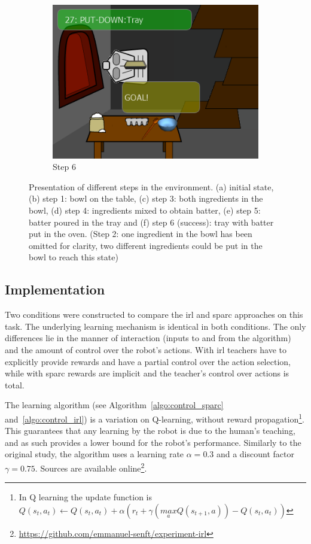 \begin{figure}[ht]
\begin{subfigure}[b]{0.325\textwidth}
		\includegraphics[width=\textwidth]{step6.png}
		\caption{Step 6}
		\label{fig:control_goal}
	\end{subfigure}
	
	\caption{Presentation of different steps in the environment. (a) initial state, (b) step 1: bowl on the table, (c) step 3: both ingredients in the bowl, (d) step 4: ingredients mixed to obtain batter, (e) step 5: batter poured in the tray and (f) step 6 (success): tray with batter put in the oven. (Step 2: one ingredient in the bowl has been omitted for clarity, two different ingredients could be put in the bowl to reach this state)}
	\label{fig:control_states}
\end{figure}

\subsection{Implementation}

Two conditions were constructed to compare the \gls{irl} and \gls{sparc} approaches on this task. The underlying learning mechanism is identical in both conditions. The only differences lie in the manner of interaction (inputs to and from the algorithm) and the amount of control over the robot's actions. With \gls{irl} teachers have to explicitly provide rewards and have a partial control over the action selection, while with \gls{sparc} rewards are implicit and the teacher's control over actions is total. 

The learning algorithm (see Algorithm~\ref{algo:control_sparc} and~\ref{algo:control_irl}) is a variation on Q-learning, without reward propagation\footnote{In Q learning the update function is $Q(s_{t},a_{t}) \leftarrow Q(s_{t},a_{t}) + \alpha (r_{t}+\gamma (\underset{a}{max} Q(s_{t+1},a))-Q(s_{t},a_{t}))$}. This guarantees that any learning by the robot is due to the human's teaching, and as such provides a lower bound for the robot's performance. 
Similarly to the original study, the algorithm uses a learning rate $\alpha = 0.3$ and a discount factor $\gamma = 0.75$. Sources are available online\footnote{\url{https://github.com/emmanuel-senft/experiment-irl}}.

